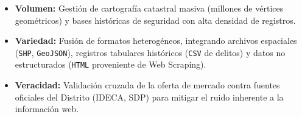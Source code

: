 \documentclass[12pt, a4paper, twoside, openright]{report}
\theoremstyle{plain}
\theoremstyle{definition}
\begin{document}
\begin{itemize}
    \item \textbf{Volumen:} Gestión de cartografía catastral masiva (millones de vértices geométricos) y bases históricas de seguridad con alta densidad de registros.
    \item \textbf{Variedad:} Fusión de formatos heterogéneos, integrando archivos espaciales (\texttt{SHP}, \texttt{GeoJSON}), registros tabulares históricos (\texttt{CSV} de delitos) y datos no estructurados (\texttt{HTML} proveniente de Web Scraping).
    \item \textbf{Veracidad:} Validación cruzada de la oferta de mercado contra fuentes oficiales del Distrito (IDECA, SDP) para mitigar el ruido inherente a la información web.
\end{itemize}
\end{document}
